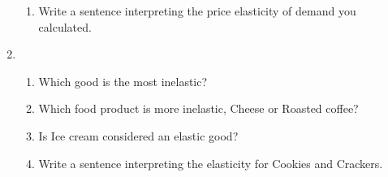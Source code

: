 \documentclass[11pt]{article}
\begin{document}
\begin{enumerate}
\begin{enumerate}
    \item Write a sentence interpreting the price elasticity of demand you calculated.
  \end{enumerate}
  
  \newpage
\begin{table}[htbp]
    \centering
    \caption{Estimates of the Price Elasticity of Demand for Selected Food Products}
\end{table}
\item
	\begin{enumerate}
    \item Which good is the most inelastic?
    
    \item Which food product is more inelastic, Cheese or Roasted coffee?
    
    \item Is Ice cream considered an elastic good?
    
    \item Write a sentence interpreting the elasticity for Cookies and Crackers.
  \end{enumerate}
  

\end{enumerate}
\end{document}
